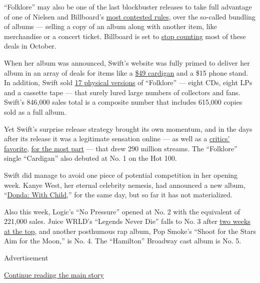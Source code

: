 ``Folklore'' may also be one of the last blockbuster releases to take
full advantage of one of Nielsen and Billboard's
\href{https://www.nytimes.com/2019/06/09/business/media/billboard-charts-bundles.html}{most
contested rules}, over the so-called bundling of albums --- selling a
copy of an album along with another item, like merchandise or a concert
ticket. Billboard is set to
\href{https://www.nytimes.com/2020/07/14/arts/music/billboard-ticket-merchandise-bundles.html}{stop
counting} most of these deals in October.

When her album was announced, Swift's website was fully primed to
deliver her album in an array of deals for items like a
\href{https://twitter.com/bybrianbyrne/status/1289312401360187392}{\$49
cardigan} and a \$15 phone stand. In addition, Swift sold
\href{https://www.nytimes.com/2020/07/27/arts/music/juice-wrld-taylor-swift-billboard.html}{17
physical versions} of ``Folklore'' --- eight CDs, eight LPs and a
cassette tape --- that surely lured large numbers of collectors and
fans. Swift's 846,000 sales total is a composite number that includes
615,000 copies sold as a full album.

Yet Swift's surprise release strategy brought its own momentum, and in
the days after its release it was a legitimate sensation online --- as
well as a
\href{https://www.metacritic.com/music/folklore/taylor-swift}{critics'
favorite},
\href{https://www.nytimes.com/2020/07/26/arts/music/taylor-swift-folklore-review.html}{for
the most part} --- that drew 290 million streams. The ``Folklore''
single ``Cardigan'' also debuted at No. 1 on the Hot 100.

Swift did manage to avoid one piece of potential competition in her
opening week. Kanye West, her eternal celebrity nemesis, had announced a
new album,
``\href{https://www.nytimes.com/2020/07/23/arts/music/taylor-swift-kanye-west.html}{Donda:
With Child},'' for the same day, but so far it has not materialized.

Also this week, Logic's ``No Pressure'' opened at No. 2 with the
equivalent of 221,000 sales. Juice WRLD's ``Legends Never Die'' falls to
No. 3 after
\href{https://www.nytimes.com/2020/07/27/arts/music/juice-wrld-taylor-swift-billboard.html}{two
weeks at the top}, and another posthumous rap album, Pop Smoke's ``Shoot
for the Stars Aim for the Moon,'' is No. 4. The ``Hamilton'' Broadway
cast album is No. 5.

Advertisement

\protect\hyperlink{after-bottom}{Continue reading the main story}

